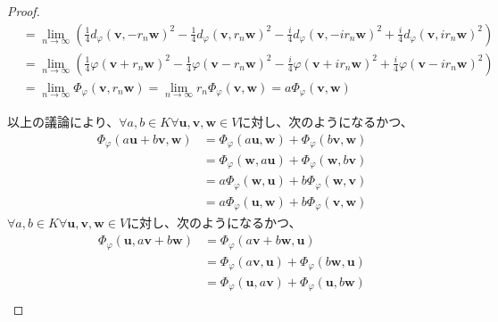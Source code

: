 \documentclass[dvipdfmx]{jsarticle}
\begin{document}
\begin{proof}
\begin{align*}
&= \lim_{n \rightarrow \infty}\left( \frac{1}{4}{d_{\varphi}\left( \mathbf{v}, - r_{n}\mathbf{w} \right)}^{2} - \frac{1}{4}{d_{\varphi}\left( \mathbf{v},r_{n}\mathbf{w} \right)}^{2} - \frac{i}{4}{d_{\varphi}\left( \mathbf{v}, - ir_{n}\mathbf{w} \right)}^{2} + \frac{i}{4}{d_{\varphi}\left( \mathbf{v},ir_{n}\mathbf{w} \right)}^{2} \right)\\
&= \lim_{n \rightarrow \infty}\left( \frac{1}{4}{\varphi\left( \mathbf{v} + r_{n}\mathbf{w} \right)}^{2} - \frac{1}{4}{\varphi\left( \mathbf{v} - r_{n}\mathbf{w} \right)}^{2} - \frac{i}{4}{\varphi\left( \mathbf{v} + ir_{n}\mathbf{w} \right)}^{2} + \frac{i}{4}{\varphi\left( \mathbf{v} - ir_{n}\mathbf{w} \right)}^{2} \right)\\
&= \lim_{n \rightarrow \infty}{\varPhi_{\varphi}\left( \mathbf{v},r_{n}\mathbf{w} \right)} = \lim_{n \rightarrow \infty}{r_{n}\varPhi_{\varphi}\left( \mathbf{v},\mathbf{w} \right)} = a\varPhi_{\varphi}\left( \mathbf{v},\mathbf{w} \right)
\end{align*}\par
以上の議論により、$\forall a,b \in K\forall\mathbf{u},\mathbf{v},\mathbf{w} \in V$に対し、次のようになるかつ、
\begin{align*}
\varPhi_{\varphi}\left( a\mathbf{u} + b\mathbf{v},\mathbf{w} \right) &= \varPhi_{\varphi}\left( a\mathbf{u},\mathbf{w} \right) + \varPhi_{\varphi}\left( b\mathbf{v},\mathbf{w} \right)\\
&= \varPhi_{\varphi}\left( \mathbf{w},a\mathbf{u} \right) + \varPhi_{\varphi}\left( \mathbf{w},b\mathbf{v} \right)\\
&= a\varPhi_{\varphi}\left( \mathbf{w},\mathbf{u} \right) + b\varPhi_{\varphi}\left( \mathbf{w},\mathbf{v} \right)\\
&= a\varPhi_{\varphi}\left( \mathbf{u},\mathbf{w} \right) + b\varPhi_{\varphi}\left( \mathbf{v},\mathbf{w} \right)
\end{align*}
$\forall a,b \in K\forall\mathbf{u},\mathbf{v},\mathbf{w} \in V$に対し、次のようになるかつ、
\begin{align*}
\varPhi_{\varphi}\left( \mathbf{u},a\mathbf{v} + b\mathbf{w} \right) &= \varPhi_{\varphi}\left( a\mathbf{v} + b\mathbf{w},\mathbf{u} \right)\\
&= \varPhi_{\varphi}\left( a\mathbf{v},\mathbf{u} \right) + \varPhi_{\varphi}\left( b\mathbf{w},\mathbf{u} \right)\\
&= \varPhi_{\varphi}\left( \mathbf{u},a\mathbf{v} \right) + \varPhi_{\varphi}\left( \mathbf{u},b\mathbf{w} \right)\\

\end{align*}
\end{proof}
\end{document}
